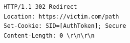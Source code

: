 \begin{verbatim}
        HTTP/1.1 302 Redirect
        Location: https://victim.com/path
        Set-Cookie: SID=[AuthToken]; Secure
        Content-Length: 0 \r\n\r\n
\end{verbatim}